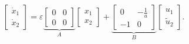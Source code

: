 \documentclass[../main.tex]{subfiles}
\begin{document}
 \begin{equation}\label{system5l}
	 \left[ {\begin{array}{*{20}{c}}
			 {{{\dot x}_1}}\\
			 {{{\dot x}_2}}
	 \end{array}} \right] = \varepsilon \underbrace {\left[ {\begin{array}{*{20}{c}}
				 0&0\\
				 0&0
		 \end{array}} \right]}_A\left[ {\begin{array}{*{20}{c}}
			 {{x_1}}\\
			 {{x_2}}
	 \end{array}} \right] + \underbrace {\left[ {\begin{array}{*{20}{c}}
				 0&-\frac{1}{a}\\
				 -1&0
		 \end{array}} \right]}_B\left[ \begin{array}{c}
		 u_1 \\ 
		 \tilde{u}_2
	 \end{array} \right].
 \end{equation}
 
\end{document}

